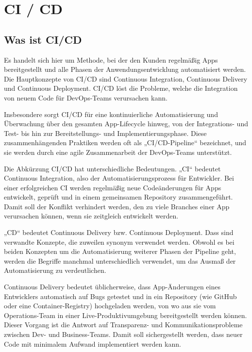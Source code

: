 \chapter{CI / CD}
\section{Was ist CI/CD}

Es handelt sich hier um Methode, bei der den Kunden regelmäßig Apps bereitgestellt und alle Phasen der Anwendungsentwicklung automatisiert werden. Die Hauptkonzepte von CI/CD sind Continuous Integration, Continuous Delivery und Continuous Deployment. CI/CD löst die Probleme, welche die Integration von neuem Code für DevOps-Teams verursachen kann.\cite{whatIsCICD}

Insbesondere sorgt CI/CD für eine kontinuierliche Automatisierung und Überwachung über den gesamten App-Lifecycle hinweg, von der Integrations- und Test- bis hin zur Bereitstellungs- und Implementierungsphase. Diese zusammenhängenden Praktiken werden oft als „CI/CD-Pipeline“ bezeichnet, und sie werden durch eine agile Zusammenarbeit der DevOps-Teams unterstützt.\autocite{whatIsCICD}

Die Abkürzung CI/CD hat unterschiedliche Bedeutungen. „CI“ bedeutet Continuous Integration, also der Automatisierungsprozess für Entwickler. Bei einer erfolgreichen CI werden regelmäßig neue Codeänderungen für Apps entwickelt, geprüft und in einem gemeinsamen Repository zusammengeführt. Damit soll der Konflikt verhindert werden, den zu viele Branches einer App verursachen können, wenn sie zeitgleich entwickelt werden.\autocite{whatIsCICD}

„CD“ bedeutet Continuous Delivery bzw. Continuous Deployment. Dass sind verwandte Konzepte, die zuweilen synonym verwendet werden. Obwohl es bei beiden Konzepten um die Automatisierung weiterer Phasen der Pipeline geht, werden die Begriffe manchmal unterschiedlich verwendet, um das Ausmaß der Automatisierung zu verdeutlichen.\autocite{whatIsCICD}

Continuous Delivery bedeutet üblicherweise, dass App-Änderungen eines Entwicklers automatisch auf Bugs getestet und in ein Repository (wie GitHub oder eine Container-Registry) hochgeladen werden, von wo aus sie vom Operations-Team in einer Live-Produktivumgebung bereitgestellt werden können. Dieser Vorgang ist die Antwort auf Transparenz- und Kommunikationsprobleme zwischen Dev- und Business-Teams. Damit soll sichergestellt werden, dass neuer Code mit minimalem Aufwand implementiert werden kann.\autocite{whatIsCICD}

